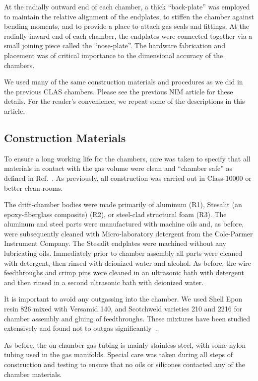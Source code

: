 At the radially outward end of each chamber, a thick ``back-plate'' was 
employed to maintain the relative 
alignment of the endplates, to stiffen the chamber against bending moments, 
and to provide a place to attach gas seals and fittings. At the radially inward 
end of each chamber, the endplates were connected together via a small joining 
piece called the ``nose-plate''.  The hardware fabrication and placement 
was of critical importance to the dimensional accuracy of the chambers.

We used many of the same construction materials and procedures as we did
in the previous CLAS chambers.  Please see the previous NIM article \cite{dcnim} 
for these details.  For the reader's convenience, we repeat some of the descriptions
in this article.

\subsection{Construction Materials}
\label{materials}

To ensure a long working life for the chambers, care was taken to 
specify that all materials in contact with the gas volume were clean and ``chamber 
safe'' as defined in Ref.~\cite{kadyk}.  As previously, all construction was carried out in 
Class-10000 or better clean rooms.

The drift-chamber bodies were made primarily of aluminum (R1), Stesalit (an epoxy-fiberglass composite) (R2),
or steel-clad structural foam (R3).  The aluminum and steel parts were 
manufactured with machine oils and, as before, were subsequently cleaned with  
Micro-laboratory detergent from the Cole-Parmer Instrument Company.  The 
Stesalit endplates were machined without any lubricating oils.  Immediately 
prior to chamber assembly all parts were cleaned with detergent, then rinsed with
deionized water and alcohol.  As before, the 
wire feedthroughs and crimp pins were cleaned in an ultrasonic bath 
with detergent and then rinsed in a second ultrasonic bath with deionized water.

It is important to avoid any outgassing into the chamber.  We used Shell Epon resin 826 mixed with Versamid 140, and 
Scotchweld varieties 210 and 2216 for chamber assembly and gluing of feedthroughs.  These mixtures have been 
studied extensively and found not to outgas significantly~\cite{nasa}.

As before, the on-chamber gas tubing is mainly stainless steel, with some
nylon tubing used in the gas manifolds.  Special care was taken during
all steps of construction and testing to ensure that no oils or
silicones contacted any of the chamber materials.

